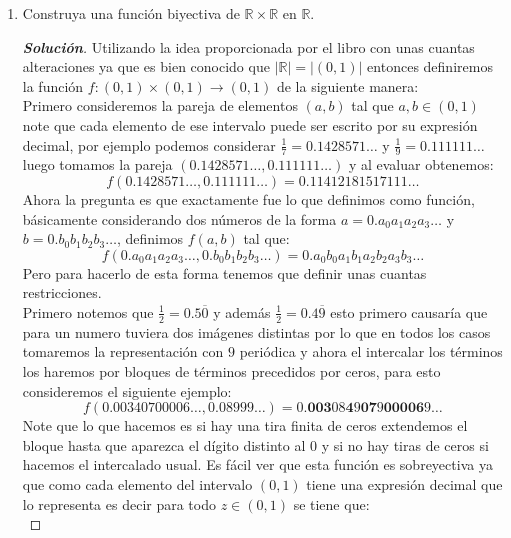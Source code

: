 \documentclass[11pt]{article}
\numberwithin{equation}{section}
\numberwithin{figure}{section}
\begin{document}
\begin{enumerate}
\begin{proof}[\textbf{Solución usando A.E.}]
   \end{proof}
   \item Construya una función biyectiva de $\mathbb{R}\times\mathbb{R}$ en $\mathbb{R}$.
   \begin{proof}[\textbf{Solución}]
   Utilizando la idea proporcionada por el libro con unas cuantas alteraciones ya que es bien conocido que $|\mathbb{R}|=|(0,1)|$ entonces definiremos la función $f:(0,1)\times(0,1)\longrightarrow(0,1)$ de la siguiente manera:\\
   Primero consideremos la pareja de elementos $(a,b)$ tal que $a,b\in(0,1)$ note que cada elemento de ese intervalo puede ser escrito por su expresión decimal, por ejemplo podemos considerar $\frac{1}{7}=0.1428571\dots$ y $\frac{1}{9}=0.111111\dots$ luego tomamos la pareja $(0.1428571\dots,0.111111\dots)$ y al evaluar obtenemos:
   \begin{equation*}
       f(0.1428571\dots,0.111111\dots)=0.11412181517111\dots
   \end{equation*}
   Ahora la pregunta es que exactamente fue lo que definimos como función, básicamente considerando dos números de la forma $a=0.a_0a_1a_2a_3\dots$ y $b=0.b_0b_1b_2b_3\dots$, definimos $f(a,b)$ tal que:
   \begin{equation*}
       f(0.a_0a_1a_2a_3\dots,0.b_0b_1b_2b_3\dots)=0.a_0b_0a_1b_1a_2b_2a_3b_3\dots
   \end{equation*}
   Pero para hacerlo de esta forma tenemos que definir unas cuantas restricciones.\\
   Primero notemos que $\frac{1}{2}=0.5\overline{0}$ y además $\frac{1}{2}=0.4\overline{9}$ esto primero causaría que para un numero tuviera dos imágenes distintas por lo que en todos los casos tomaremos la representación con $9$ periódica y ahora el intercalar los términos los haremos por bloques de términos precedidos por ceros, para esto consideremos el siguiente ejemplo:
   \begin{equation*}
       f(0.00340700006\dots,0.08999\dots)=0.\mathbf{003}08\mathbf{4}9\mathbf{07}9\mathbf{00006}9\dots
   \end{equation*}
   Note que lo que hacemos es si hay una tira finita de ceros extendemos el bloque hasta que aparezca el dígito distinto al $0$  y si no hay tiras de ceros si hacemos el intercalado usual. Es fácil ver que esta función es sobreyectiva ya que como cada elemento del intervalo $(0,1)$ tiene una expresión decimal que lo representa es decir para todo $z\in(0,1)$ se tiene que:
   \begin{equation*}

\end{equation*}
\end{proof}
\end{enumerate}
\end{document}
